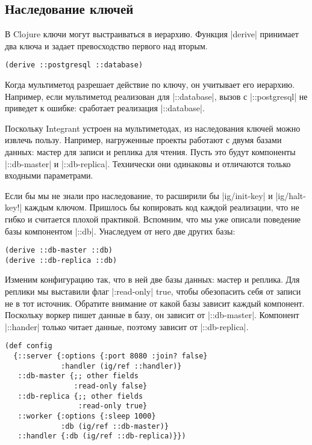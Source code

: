 \subsection{Наследование ключей}

В Clojure ключи могут выстраиваться в иерархию. Функция \spverb|derive| принимает два
ключа и задает превосходство первого над вторым.

\begin{verbatim}
(derive ::postgresql ::database)
\end{verbatim}

Когда мультиметод разрешает действие по ключу, он учитывает его
иерархию. Например, если мультиметод реализован для \spverb|::database|, вызов с
\spverb|::postgresql| не приведет к ошибке: сработает реализация \spverb|::database|.

Поскольку Integrant устроен на мультиметодах, из наследования ключей можно
извлечь пользу. Например, нагруженные проекты работают с двумя базами данных:
мастер для записи и реплика для чтения. Пусть это будут компоненты \spverb|::db-master|
и \spverb|::db-replica|. Технически они одинаковы и отличаются только входными
параметрами.

Если бы мы не знали про наследование, то расширили бы \spverb|ig/init-key| и
\spverb|ig/halt-key!| каждым ключом. Пришлось бы копировать код каждой реализации, что
не гибко и считается плохой практикой. Вспомним, что мы уже описали поведение
базы компонентом \spverb|::db|. Унаследуем от него две других базы:

\begin{verbatim}
(derive ::db-master ::db)
(derive ::db-replica ::db)
\end{verbatim}

Изменим конфигурацию так, что в ней две базы данных: мастер и реплика. Для
реплики мы выставили флаг \spverb|:read-only| true, чтобы обезопасить себя от записи не
в тот источник. Обратите внимание от какой базы зависит каждый
компонент. Поскольку воркер пишет данные в базу, он зависит от
\spverb|::db-master|. Компонент \spverb|::hander| только читает данные, поэтому зависит от
\spverb|::db-replica|.

\begin{verbatim}
(def config
  {::server {:options {:port 8080 :join? false}
             :handler (ig/ref ::handler)}
   ::db-master {;; other fields
                :read-only false}
   ::db-replica {;; other fields
                 :read-only true}
   ::worker {:options {:sleep 1000}
             :db (ig/ref ::db-master)}
   ::handler {:db (ig/ref ::db-replica)}})
\end{verbatim}

